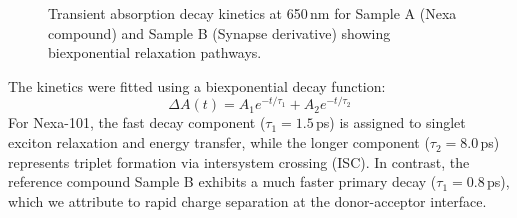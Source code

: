 \begin{figure}[t]
  \centering
  \caption{Transient absorption decay kinetics at 650\,nm for Sample A (Nexa compound) and Sample B (Synapse derivative) showing biexponential relaxation pathways.}
  \label{fig:kinetics}
\end{figure}

The kinetics were fitted using a biexponential decay function:
\begin{equation}
  \Delta A(t) = A_1 e^{-t/\tau_1} + A_2 e^{-t/\tau_2}
\end{equation}
For Nexa-101, the fast decay component ($\tau_1 = 1.5$\,ps) is assigned to singlet exciton relaxation and energy transfer, while the longer component ($\tau_2 = 8.0$\,ps) represents triplet formation via intersystem crossing (ISC). In contrast, the reference compound Sample B exhibits a much faster primary decay ($\tau_1 = 0.8$\,ps), which we attribute to rapid charge separation at the donor-acceptor interface.
